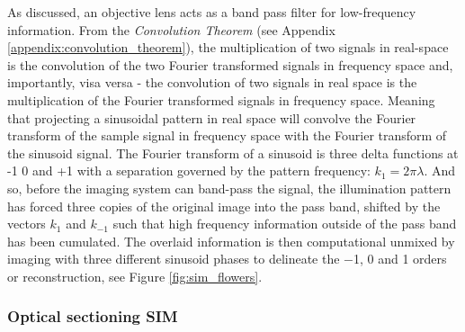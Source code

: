 As discussed, an objective lens acts as a band pass filter for low-frequency information.
From the \emph{Convolution Theorem} (see Appendix \ref{appendix:convolution_theorem}), the multiplication of two signals in real-space is the convolution of the two Fourier transformed signals in frequency space and, importantly, visa versa -
the convolution of two signals in real space is the multiplication of the Fourier transformed signals in frequency space.
Meaning that projecting a sinusoidal pattern in real space will convolve the Fourier transform of the sample signal in frequency space with the Fourier transform of the sinusoid signal.
The Fourier transform of a sinusoid is three delta functions at -1 0 and +1 with a separation governed by the pattern frequency: $k_1 = {2\pi}{\lambda}$.
And so, before the imaging system can band-pass the signal, the illumination pattern has forced three copies of the original image into the pass band, shifted by the vectors $k_1$ and $k_{-1}$ such that high frequency information outside of the pass band has been cumulated.
The overlaid information is then computational unmixed by imaging with three different sinusoid phases to delineate the \SI{-1}{}, \SI{0}{} and \SI{+1}{} orders or reconstruction, see Figure \ref{fig:sim_flowers}.

\subsubsection{Optical sectioning SIM}

